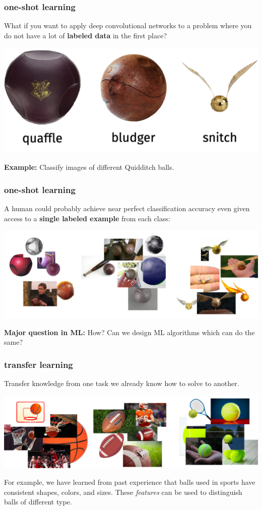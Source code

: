 \documentclass[handout,compress]{beamer}
\begin{document}
\begin{frame}
	\frametitle{one-shot learning}
	\small
	What if you want to apply deep convolutional networks to a problem where you do not have a lot of \textbf{labeled data} in the first place?
	\begin{center}
		\includegraphics[width=.7\textwidth]{hp.png}
		
		\textbf{Example:} Classify images of different Quidditch balls.	
	\end{center}
\end{frame}

\begin{frame}
	\frametitle{one-shot learning}
	A human could probably achieve near perfect classification accuracy even given access to a \textbf{single labeled example} from each class:
	\begin{center}
		\includegraphics[width=\textwidth]{one_shot.png}
	\end{center}
	\textbf{Major question in ML:} How? Can we design ML algorithms which can do the same?
\end{frame}

\begin{frame}
	\frametitle{transfer learning}
	Transfer knowledge from one task we already know how to solve to another.
	\begin{center}
		\includegraphics[width=\textwidth]{regular_balls.png}
	\end{center}
For example, we have learned from past experience that balls used in sports have consistent shapes, colors, and sizes. These \emph{features} can be used to distinguish balls of different type. 
\end{frame}
\end{document}
